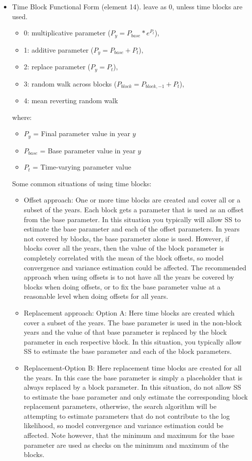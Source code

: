 \begin{itemize}
\item Time Block Functional Form (element 14). leave as 0, unless time blocks are used.
	\begin{itemize}
		\item 0: multiplicative parameter ($P_{y} = P_{base}*e^{P_t}$),
		\item 1: additive parameter ($P_{y} = P_{base} + P_t$),
		\item 2: replace parameter ($P_{y} = P_t$),
		\item 3: random walk across blocks ($P_{block} = P_{block,-1} + P_t$),
		\item 4: mean reverting random walk
	\end{itemize}
	where:
	\begin{itemize}
        \item $P_{y}$ = Final parameter value in year $y$
        \item $P_{base}$ = Base parameter value in year $y$
		\item $P_{t}$ = Time-varying parameter value
     \end{itemize}
	 Some common situations of using time blocks: 
	 \begin{itemize}
		\item Offset approach: One or more time blocks are created and cover all or a subset of the years.  Each block gets a parameter that is used as an offset from the base parameter.  In this situation you typically will allow SS to estimate the base parameter and each of the offset parameters.  In years not covered by blocks, the base parameter alone is used.  However, if blocks cover all the years, then the value of the block parameter is completely correlated with the mean of the block offsets, so model convergence and variance estimation could be affected.  The recommended approach when using offsets is to not have all the years be covered by blocks when doing offsets, or to fix the base parameter value at a reasonable level when doing offsets for all years.	
		\item Replacement approach: Option A: Here time blocks are created which cover a subset of the years.  The base parameter is used in the non-block years and the value of that base parameter is replaced by the block parameter in each respective block.  In this situation, you typically allow SS to estimate the base parameter and each of the block parameters.	
		\item Replacement-Option B: Here replacement time blocks are created for all the years.  In this case the base parameter is simply a placeholder that is always replaced by a block parameter. In this situation, do not allow SS to estimate the base parameter and only estimate the corresponding block replacement parameters, otherwise, the search algorithm will be attempting to estimate parameters that do not contribute to the log likelihood, so model convergence and variance estimation could be affected.  Note however, that the minimum and maximum for the base parameter are used as checks on the minimum and maximum of the blocks.
    \end{itemize}
\end{itemize}


